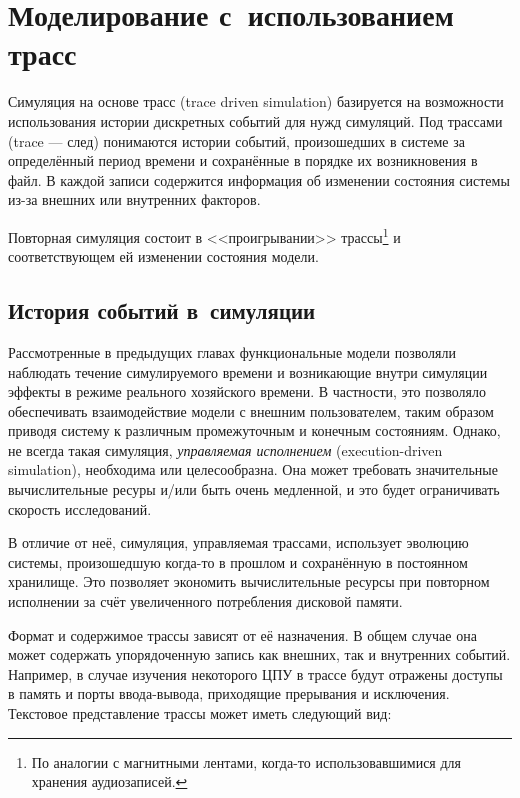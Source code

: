 \chapter{Моделирование с~использованием трасс}\label{traces}


Симуляция на основе трасс (\abbr trace driven simulation) базируется на возможности использования истории дискретных событий для нужд симуляций. Под трассами (\abbr trace --- след) понимаются истории событий, произошедших в системе за определённый период времени и сохранённые в порядке их возникновения в файл. В каждой записи содержится информация об изменении состояния системы из-за внешних или внутренних факторов. 

Повторная симуляция состоит в <<проигрывании>> трассы\footnote{По аналогии с магнитными лентами, когда-то использовавшимися для хранения аудиозаписей.} и соответствующем ей изменении состояния модели.

\section{История событий в~симуляции}

Рассмотренные в предыдущих главах функциональные модели позволяли наблюдать течение симулируемого времени и возникающие внутри симуляции эффекты в режиме реального хозяйского времени. В частности, это позволяло обеспечивать взаимодействие модели с внешним  пользователем, таким образом приводя систему к различным промежуточным и конечным состояниям. Однако, не всегда такая симуляция, \textit{управляемая исполнением} (\abbr execution-driven simulation), необходима или целесообразна. Она может требовать значительные вычислительные ресуры и/или быть очень медленной, и это будет ограничивать скорость исследований.

В отличие от неё, симуляция, управляемая трассами, использует эволюцию системы, произошедшую когда-то в прошлом и сохранённую в постоянном хранилище. Это позволяет экономить вычислительные ресурсы при повторном исполнении за счёт увеличенного потребления дисковой памяти.

Формат и содержимое трассы зависят от её назначения. В общем случае она может содержать упорядоченную запись как внешних, так и внутренних событий. Например, в случае изучения некоторого ЦПУ в трассе будут отражены доступы в память и порты ввода-вывода, приходящие прерывания и исключения. Текстовое представление трассы может иметь следующий вид:

